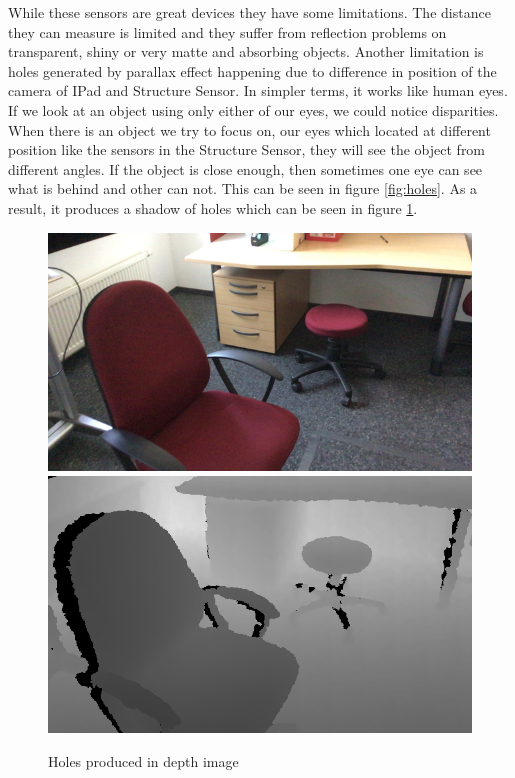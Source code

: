 While these sensors are great devices they have some limitations. The distance they can measure is limited and they suffer from reflection problems on transparent, shiny or very matte and absorbing objects. Another limitation is holes generated by parallax effect happening due to difference in position of the camera of IPad and Structure Sensor\cite{Kalantari}. In simpler terms, it works like human eyes. If we look at an object using only either of our eyes, we could notice disparities. When there is an object we try to focus on, our eyes which located at different position like the sensors in the Structure Sensor, they will see the object from different angles. If the object is close enough, then sometimes one eye can see what is behind and other can not. This can be seen in figure \ref{fig:holes}. As a result, it produces a shadow of holes which can be seen in figure \ref{fig:holes2}.



\begin{figure}[!]
\centering
    \includegraphics[scale=0.29]{Figures/RGB.png} \includegraphics[scale=0.37]{Figures/Depth.png}
    \caption{Holes produced in depth image}
    \label{fig:holes2}
\end{figure}


